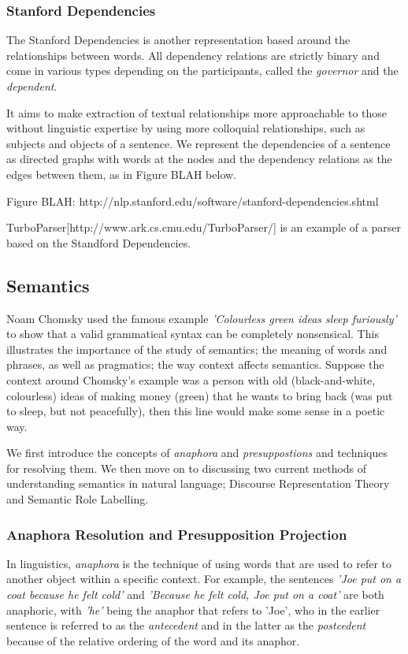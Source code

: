 \subsubsection{Stanford Dependencies}
\label{sec:stanford-deps}
The Stanford Dependencies\cite{de2008stanford} is another representation based around the relationships between words. All dependency relations are strictly binary and come in various types depending on the participants, called the \textit{governor} and the \textit{dependent}.

It aims to make extraction of textual relationships more approachable to those without linguistic expertise by using more colloquial relationships, such as subjects and objects of a sentence. We represent the dependencies of a sentence as directed graphs with words at the nodes and the dependency relations as the edges between them, as in Figure BLAH below.

Figure BLAH: http://nlp.stanford.edu/software/stanford-dependencies.shtml

TurboParser[http://www.ark.cs.cmu.edu/TurboParser/] is an example of a parser based on the Standford Dependencies.


\subsection{Semantics}
\label{sec:semantics}
Noam Chomsky used the famous example \textit{'Colourless green ideas sleep furiously'} to show that a valid grammatical syntax can be completely nonsensical\cite{chomsky2002syntactic}. This illustrates the importance of the study of semantics; the meaning of words and phrases, as well as pragmatics; the way context affects semantics. Suppose the context around Chomsky's example was a person with old (black-and-white, colourless) ideas of making money (green) that he wants to bring back (was put to sleep, but not peacefully), then this line would make some sense in a poetic way.

We first introduce the concepts of \textit{anaphora} and \textit{presuppostions} and techniques for resolving them. We then move on to discussing two current methods of understanding semantics in natural language; Discourse Representation Theory and Semantic Role Labelling.

\subsubsection{Anaphora Resolution and Presupposition Projection}
\label{sec:arback}
In linguistics, \textit{anaphora} is the technique of using words that are used to refer to another object within a specific context. For example, the sentences \textit{'Joe put on a coat because he felt cold'} and \textit{'Because he felt cold, Joe put on a coat'} are both anaphoric, with \textit{'he'} being the anaphor that refers to 'Joe', who in the earlier sentence is referred to as the \textit{antecedent} and in the latter as the \textit{postcedent} because of the relative ordering of the word and its anaphor.

